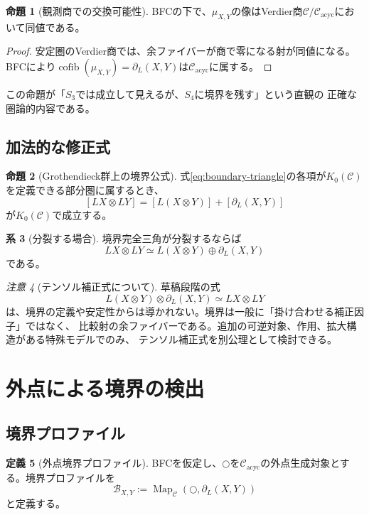 \documentclass[11pt,a4paper]{ltjsarticle}
\theoremstyle{definition}
\newtheorem{definition}{定義}[section]
\newtheorem{proposition}[definition]{命題}
\newtheorem{corollary}[definition]{系}
\theoremstyle{remark}
\newtheorem{remark}[definition]{注意}
\newcommand{\C}{\mathcal{C}}
\newcommand{\Cacyc}{\mathcal{C}_{\mathrm{acyc}}}
\newcommand{\cofib}{\operatorname{cofib}}
\newcommand{\Map}{\operatorname{Map}}
\newcommand{\Boundary}{\partial_L}
\newcommand{\Kzero}{K_0}
\begin{document}
\begin{proposition}[観測商での交換可能性]
BFCの下で、$\mu_{X,Y}$の像はVerdier商$\C/\Cacyc$において同値である。
\end{proposition}

\begin{proof}
安定圏のVerdier商では、余ファイバーが商で零になる射が同値になる。
BFCにより$\cofib(\mu_{X,Y})=\Boundary(X,Y)$は$\Cacyc$に属する。
\end{proof}

この命題が「$S_3$では成立して見えるが、$S_4$に境界を残す」という直観の
正確な圏論的内容である。

\subsection{加法的な修正式}

\begin{proposition}[Grothendieck群上の境界公式]
式\eqref{eq:boundary-triangle}の各項が$\Kzero(\C)$を定義できる部分圏に属するとき、
\[
 [LX\otimes LY]
 = [L(X\otimes Y)]+[\Boundary(X,Y)]
\]
が$\Kzero(\C)$で成立する。
\end{proposition}

\begin{corollary}[分裂する場合]
境界完全三角が分裂するならば
\[
 LX\otimes LY\simeq L(X\otimes Y)\oplus\Boundary(X,Y)
\]
である。
\end{corollary}

\begin{remark}[テンソル補正式について]
草稿段階の式
\[
 L(X\otimes Y)\otimes\Boundary(X,Y)\simeq LX\otimes LY
\]
は、境界の定義や安定性からは導かれない。境界は一般に「掛け合わせる補正因子」ではなく、
比較射の余ファイバーである。追加の可逆対象、作用、拡大構造がある特殊モデルでのみ、
テンソル補正式を別公理として検討できる。
\end{remark}

\section{外点による境界の検出}

\subsection{境界プロファイル}

\begin{definition}[外点境界プロファイル]
BFCを仮定し、$\bigcirc$を$\Cacyc$の外点生成対象とする。境界プロファイルを
\[
 \mathcal{B}_{X,Y}:=\Map_{\C}(\bigcirc,\Boundary(X,Y))
\]
と定義する。
\end{definition}
\end{document}

